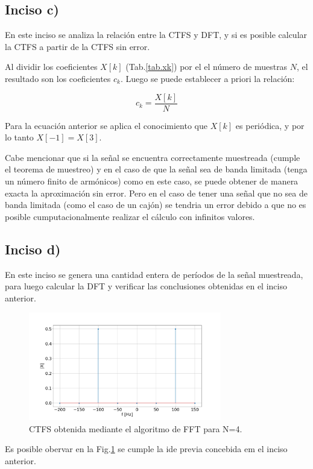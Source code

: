 \documentclass{article}
\begin{document}
    \subsection*{Inciso c)}

    En este inciso se analiza la relación entre la CTFS y DFT, y si es posible calcular la CTFS a partir de la CTFS sin error.

    Al dividir los coeficientes $X[k]$ (Tab.\ref{tab.xk}) por el el número de muestras $N$, el resultado son los coeficientes 
    $c_k$. Luego se puede establecer a priori la relación:
    
    \begin{equation}
        c_k = \frac{X[k]}{N}
    \end{equation}

    Para la ecuación anterior se aplica el conocimiento que $X[k]$ es periódica, y por lo tanto $X[-1]=X[3]$.

    Cabe mencionar que si la señal se encuentra correctamente muestreada (cumple el teorema de muestreo) y en el caso de que la señal sea de banda limitada (tenga un número finito de 
    armónicos) como en este caso, se puede obtener de manera exacta la aproximación sin error. Pero en el caso de tener una señal que no sea de banda limitada (como el caso de un cajón) se tendria un error debido 
    a que no es posible cumputacionalmente realizar el cálculo con infinitos valores.


    \subsection*{Inciso d)}

    En este inciso se genera una cantidad entera de períodos de la señal muestreada,
    para luego calcular la DFT y verificar las conclusiones obtenidas en el inciso anterior.

    \begin{figure}[H]
        \centering
        \includegraphics[width=0.75\textwidth]{Img/punto_2_d.png}
        \caption{CTFS obtenida mediante el algoritmo de FFT para N=4.}
        \label{fig.2d}
    \end{figure}
    Es posible obervar en la Fig.\ref{fig.2d} se cumple la ide previa concebida em el inciso anterior.
    
\end{document}
